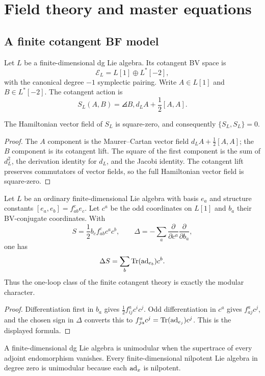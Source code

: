 \part{Field theory and master equations}

\chapter{A finite cotangent BF model}
Let $L$ be a finite-dimensional dg Lie algebra. Its cotangent BV space is
\[
 \mathcal E_L=L[1]\oplus L^*[-2],
\]
with the canonical degree $-1$ symplectic pairing. Write $A\in L[1]$ and $B\in L^*[-2]$. The cotangent action is
\[
 S_L(A,B)=\angles{B,d_LA+\frac12[A,A]}.
\]

\begin{theorem}
The Hamiltonian vector field of $S_L$ is square-zero, and consequently $\{S_L,S_L\}=0$.
\end{theorem}
\begin{proof}
The $A$ component is the Maurer--Cartan vector field $d_LA+\frac12[A,A]$; the $B$ component is its cotangent lift. The square of the first component is the sum of $d_L^2$, the derivation identity for $d_L$, and the Jacobi identity. The cotangent lift preserves commutators of vector fields, so the full Hamiltonian vector field is square-zero.
\end{proof}

\begin{proposition}
Let $L$ be an ordinary finite-dimensional Lie algebra with basis $e_a$ and structure constants $[e_a,e_b]=f^c_{ab}e_c$. Let $c^a$ be the odd coordinates on $L[1]$ and $b_a$ their BV-conjugate coordinates. With
\[
 S=\frac12 b_c f^c_{ab}c^ac^b,
 \qquad
 \Delta=-\sum_a\frac{\partial}{\partial c^a}
                 \frac{\partial}{\partial b_a},
\]
one has
\[
 \Delta S=\sum_b\operatorname{Tr}(\operatorname{ad}_{e_b})c^b.
\]
Thus the one-loop class of the finite cotangent theory is exactly the modular character.
\end{proposition}
\begin{proof}
Differentiation first in $b_a$ gives $\frac12f^a_{ij}c^ic^j$. Odd differentiation in $c^a$ gives $f^a_{aj}c^j$, and the chosen sign in $\Delta$ converts this to $f^a_{ja}c^j=\operatorname{Tr}(\operatorname{ad}_{e_j})c^j$. This is the displayed formula.
\end{proof}

A finite-dimensional dg Lie algebra is unimodular when the supertrace of every adjoint endomorphism vanishes. Every finite-dimensional nilpotent Lie algebra in degree zero is unimodular because each $\operatorname{ad}_x$ is nilpotent.


